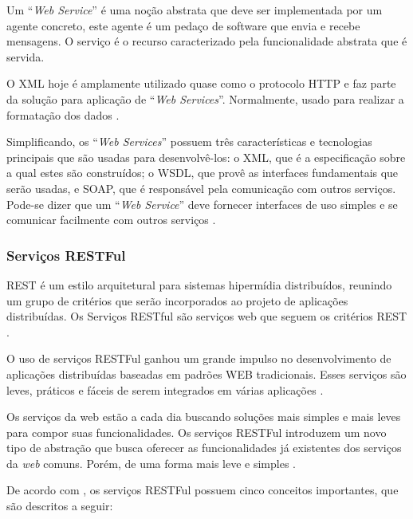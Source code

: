 Um ``\textit{Web Service}'' é uma noção abstrata que deve ser implementada por um agente concreto, este agente é um pedaço de software que envia e recebe mensagens. O serviço é o recurso caracterizado pela funcionalidade abstrata que é servida.

O XML hoje é amplamente utilizado quase como o protocolo HTTP e faz parte da solução para aplicação de ``\textit{Web Services}''. Normalmente, usado para realizar a formatação dos dados \cite{Alonso:Casati:Kuno:Machiraju:2010}.

Simplificando, os ``\textit{Web Services}'' possuem três características e tecnologias principais que são usadas para desenvolvê-los: o XML, que é a especificação sobre a qual estes são construídos; o WSDL, que provê as interfaces fundamentais que serão usadas, e SOAP, que é responsável pela comunicação com outros serviços. Pode-se dizer que um ``\textit{Web Service}'' deve fornecer interfaces de uso simples e se comunicar facilmente com outros serviços \cite{Newcomer:Lomow:2004}.

\subsubsection{Serviços RESTFul}

REST é um estilo arquitetural para sistemas hipermídia distribuídos, reunindo um grupo de critérios que serão incorporados ao projeto de aplicações distribuídas. Os Serviços RESTful são serviços web que seguem os critérios REST \cite{Filho:2009}.

O uso de serviços RESTFul ganhou um grande impulso no desenvolvimento de aplicações distribuídas baseadas em padrões WEB tradicionais. Esses serviços são leves, práticos e fáceis de serem integrados em várias aplicações \cite{Rosenberg:Curbera:Duftler:Khalaf:2008}.

Os serviços da web estão a cada dia buscando soluções mais simples e mais leves para compor suas funcionalidades. Os serviços RESTFul introduzem um novo tipo de abstração que busca oferecer as funcionalidades já existentes dos serviços da \textit{web} comuns. Porém, de uma forma mais leve e simples \cite{Pautasso:2009}.

De acordo com \cite{Filho:2009}, os serviços RESTFul possuem cinco conceitos importantes, que são descritos a seguir:

